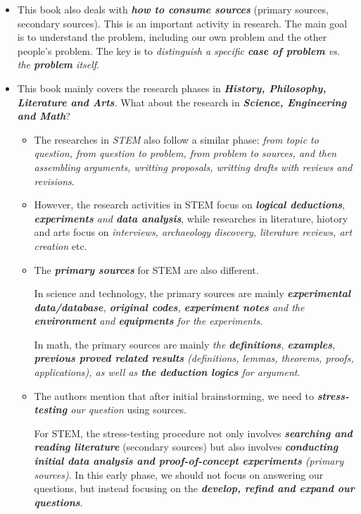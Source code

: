 \documentclass[11pt]{article}
\begin{document}
\begin{itemize}
\item This book also deals with \emph{\textbf{how to consume sources}} (primary sources, secondary sources). This is an important activity in research. The main goal is to understand the problem, including our own problem and the other people's problem.  The key is to \emph{distinguish a specific \textbf{case of problem} vs. the \textbf{problem} itself}.  

\item This book mainly covers the research phases in \emph{\textbf{History, Philosophy, Literature and Arts}.} What about the research in \emph{\textbf{Science, Engineering and Math}}?
\begin{itemize}
\item The researches in \emph{STEM} also follow a similar phase: \emph{from topic to question, from question to problem, from problem to sources, and then assembling arguments, writting proposals, writting drafts with reviews and revisions}. 

\item However, the research activities in STEM focus on \emph{\textbf{logical deductions}, \textbf{experiments} and \textbf{data analysis}}, while researches in literature, hiotory and arts focus on \emph{interviews, archaeology discovery, literature reviews, art creation} etc.  

\item The \emph{\textbf{primary sources}} for STEM are also different. 

In science and technology, the primary sources are mainly \emph{\textbf{experimental data/database}, \textbf{original codes}, \textbf{experiment notes} and the \textbf{environment} and \textbf{equipments} for the experiments}.  

In math, the primary sources are mainly \emph{the \textbf{definitions}, \textbf{examples}, \textbf{previous proved related results} (definitions, lemmas, theorems, proofs, applications), as well as \textbf{the deduction logics} for argument}. 

\item The authors mention that after initial brainstorming, we need to \emph{\textbf{stress-testing} our question} using sources. 

For STEM, the stress-testing procedure not only involves \emph{\textbf{searching and reading literature}} (secondary sources) but also involves \emph{\textbf{conducting initial data analysis and proof-of-concept experiments} (primary sources)}. In this early phase, we should not focus on answering our questions, but instead focusing on the \emph{\textbf{develop, refind and expand our questions}}.  


\end{itemize}
\end{itemize}
\end{document}
